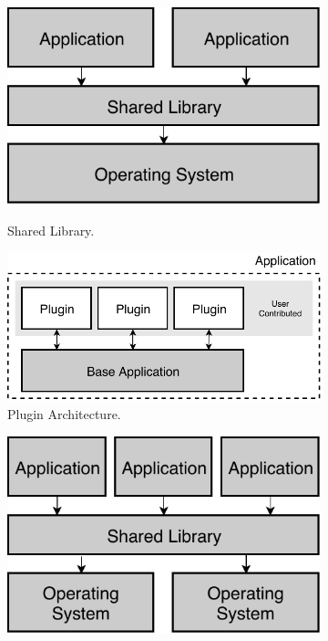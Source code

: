 \begin{figure}[th!]
	\centering
	\begin{subfigure}[t]{.45\textwidth}
		\centering
		\captionsetup{width=.9\linewidth}
		{\includegraphics[width=0.77\linewidth]{images/intro-evolution-shared-library2.pdf}}
		\caption{Shared Library.}
		\label{fig:shared-library}
	\end{subfigure}\hfill%
	\begin{subfigure}[t]{.55\textwidth}
		\centering
		\captionsetup{width=.9\linewidth}
		\includegraphics[width=0.97\linewidth]{images/intro-evolution-plugin2.pdf}
		\caption{Plugin Architecture.}
		\label{fig:plugin}
	\end{subfigure}\vspace{0.5cm}\hfill%
	\begin{subfigure}[t]{.45\textwidth}
		\centering
		\captionsetup{width=.9\linewidth}
		\includegraphics[width=0.77\linewidth]{images/intro-evolution-cross-platform2.pdf}

\end{subfigure}
\end{figure}
